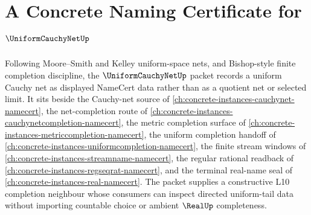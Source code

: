 \chapter{A Concrete Naming Certificate for $\UniformCauchyNetUp$}
\label{ch:concrete-instances-uniform-cauchy-net-namecert}

Following Moore--Smith and Kelley uniform-space nets, and Bishop-style finite completion discipline, the $\UniformCauchyNetUp$ packet records a uniform Cauchy net as displayed NameCert data rather than as a quotient net or selected limit. It sits beside the Cauchy-net source of \autoref{ch:concrete-instances-cauchynet-namecert}, the net-completion route of \autoref{ch:concrete-instances-cauchynetcompletion-namecert}, the metric completion surface of \autoref{ch:concrete-instances-metriccompletion-namecert}, the uniform completion handoff of \autoref{ch:concrete-instances-uniformcompletion-namecert}, the finite stream windows of \autoref{ch:concrete-instances-streamname-namecert}, the regular rational readback of \autoref{ch:concrete-instances-regseqrat-namecert}, and the terminal real-name seal of \autoref{ch:concrete-instances-real-namecert}. The packet supplies a constructive L10 completion neighbour whose consumers can inspect directed uniform-tail data without importing countable choice or ambient $\RealUp$ completeness.

